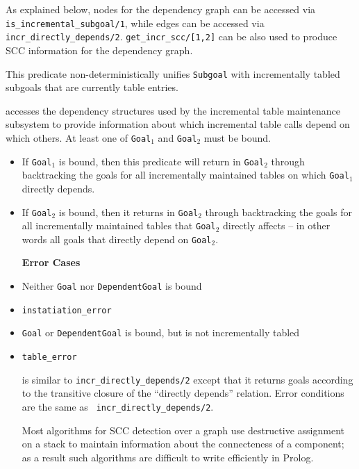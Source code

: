 As explained below, nodes for the dependency graph can be accessed via
{\tt is\_incremental\_subgoal/1}, while edges can be accessed via {\tt
  incr\_directly\_depends/2}.  {\tt get\_incr\_scc/[1,2]} can be also
used to produce SCC information for the dependency graph.

\begin{description}

%
This predicate non-deterministically unifies {\tt Subgoal} with
incrementally tabled subgoals that are currently table entries.

accesses the dependency structures used by the incremental table
maintenance subsystem to provide information about which incremental
table calls depend on which others.  At least one of {\tt Goal$_1$}
and {\tt Goal$_2$} must be bound.
\begin{itemize}
\item If {\tt Goal$_1$} is bound, then this predicate will return in
  {\tt Goal$_2$} through backtracking the goals for all incrementally
  maintained tables on which {\tt Goal$_1$} directly depends.
\item If {\tt Goal$_2$} is bound, then it returns in {\tt Goal$_2$}
  through backtracking the goals for all incrementally maintained
  tables that {\tt Goal$_2$} directly affects -- in other words all
  goals that directly depend on {\tt Goal$_2$}.  \ei

{\bf Error Cases}
\bi
\item 	Neither {\tt Goal} nor {\tt DependentGoal} is bound
\bi
\item 	{\tt instatiation\_error}
\ei
\item {\tt Goal} or {\tt DependentGoal} is bound, but is not
  incrementally tabled
\bi
\item 	{\tt table\_error}
\ei
\ei

is similar to {\tt incr\_directly\_depends/2} except that it returns
goals according to the transitive closure of the ``directly depends''
relation.  Error conditions are the same as {\tt
  incr\_directly\_depends/2}.

%
Most algorithms for SCC detection over a graph use destructive
assignment on a stack to maintain information about the connecteness
of a component; as a result such algorithms are difficult to write
efficiently in Prolog.


\end{itemize}
\end{description}
